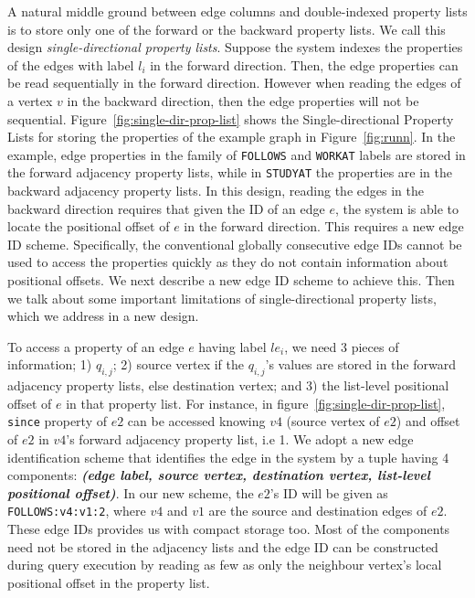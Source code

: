 A natural middle ground between edge columns and double-indexed property lists is to store only one of the forward or the backward property lists. We call this design \emph{single-directional property lists}. Suppose the system indexes the properties of the edges with label $l_i$ in the forward direction. Then, the edge properties can be read sequentially in the forward direction. However when reading the edges of a vertex $v$ in the backward direction, then the edge properties will not be sequential. Figure~\ref{fig:single-dir-prop-list} shows the Single-directional Property Lists for storing the properties of the example graph in Figure~\ref{fig:runn}. In the example, edge properties in the family of \texttt{FOLLOWS} and \texttt{WORKAT} labels are stored in the forward adjacency property lists, while in \texttt{STUDYAT} the properties are in the backward adjacency property lists. In this design, reading the edges in the backward direction requires that given the ID of an edge $e$, the system is able to locate the positional offset of $e$ in the forward direction. This requires a new edge ID scheme. Specifically, the conventional globally consecutive edge IDs cannot be used to access the properties quickly as they do not contain information about positional offsets. We next describe a new edge ID scheme to achieve this. Then we talk about some important limitations of single-directional property lists, which we address in a new design.

To access a property of an edge $e$ having label $le_i$, we need 3 pieces of information; 1) $q_{i,j}$; 2) source vertex if the $q_{i,j}$'s values are stored in the forward adjacency property lists, else destination vertex; and 3) the list-level positional offset of $e$ in that property list. For instance, in figure~\ref{fig:single-dir-prop-list}, \texttt{since} property of $e2$ can be accessed knowing $v4$ (source vertex of $e2$) and offset of $e2$ in $v4$'s forward adjacency property list, i.e 1. We adopt a new edge identification scheme that identifies the edge in the system by a tuple having 4 components: \textbf{\emph{(edge label, source vertex, destination vertex, list-level positional offset)}}. In our new scheme, the $e2$'s ID will be given as \texttt{FOLLOWS:v4:v1:2}, where $v4$ and $v1$ are the source and destination edges of $e2$. These edge IDs provides us with compact storage too. Most of the components need not be stored in the adjacency lists and the edge ID can be constructed during query execution by reading as few as only the neighbour vertex's local positional offset in the property list. 

